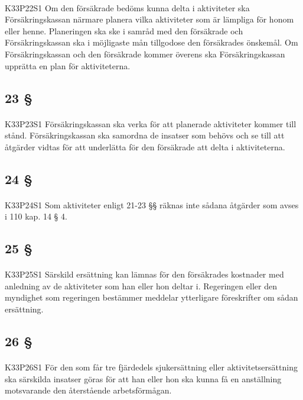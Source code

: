 \documentclass[a4paper,notitlepage,openany,10pt]{book}
\begin{document}
\paragraph*{}
{\tiny K33P22S1}
Om den försäkrade bedöms kunna delta i aktiviteter ska Försäkringskassan närmare planera vilka aktiviteter som är lämpliga för honom eller henne. Planeringen ska ske i samråd med den försäkrade och Försäkringskassan ska i möjligaste mån tillgodose den försäkrades önskemål. Om Försäkringskassan och den försäkrade kommer överens ska Försäkringskassan upprätta en plan för aktiviteterna.
\subsection*{23 §}
\paragraph*{}
{\tiny K33P23S1}
Försäkringskassan ska verka för att planerade aktiviteter kommer till stånd. Försäkringskassan ska samordna de insatser som behövs och se till att åtgärder vidtas för att underlätta för den försäkrade att delta i aktiviteterna.
\subsection*{24 §}
\paragraph*{}
{\tiny K33P24S1}
Som aktiviteter enligt 21-23 §§ räknas inte sådana åtgärder som avses i 110 kap. 14 § 4.
\subsection*{25 §}
\paragraph*{}
{\tiny K33P25S1}
Särskild ersättning kan lämnas för den försäkrades kostnader med anledning av de aktiviteter som han eller hon deltar i. Regeringen eller den myndighet som regeringen bestämmer meddelar ytterligare föreskrifter om sådan ersättning.
\subsection*{26 §}
\paragraph*{}
{\tiny K33P26S1}
För den som får tre fjärdedels sjukersättning eller aktivitetsersättning ska särskilda insatser göras för att han eller hon ska kunna få en anställning motsvarande den återstående arbetsförmågan.
\end{document}
